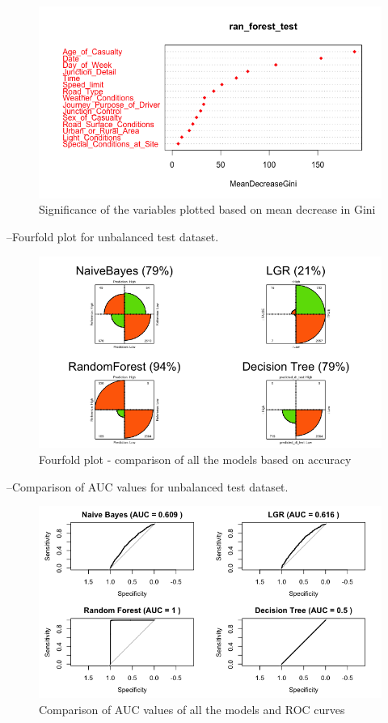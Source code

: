 \documentclass[
  a4paper,
]{article}
\begin{document}
\begin{figure}[h!]

{\centering \includegraphics[width=0.6\linewidth]{testvarimp} 

}

\caption{Significance of the variables plotted based on mean decrease in Gini}\label{fig:unnamed-chunk-21}
\end{figure}

--Fourfold plot for unbalanced test dataset.

\begin{figure}[h!]

{\centering \includegraphics[width=0.6\linewidth]{testfourplot} 

}

\caption{Fourfold plot - comparison of all the models based on accuracy}\label{fig:unnamed-chunk-22}
\end{figure}

--Comparison of AUC values for unbalanced test dataset.

\begin{figure}[h!]

{\centering \includegraphics[width=0.6\linewidth]{testroc} 

}

\caption{Comparison of  AUC values of all the models and ROC curves}\label{fig:unnamed-chunk-23}
\end{figure}
\end{document}
